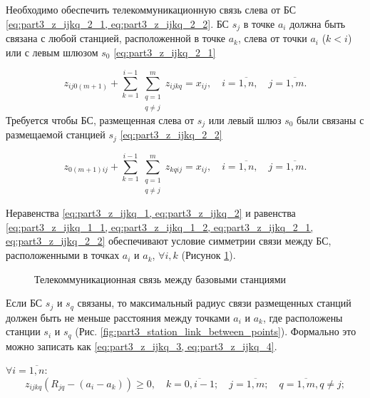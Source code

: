 Необходимо обеспечить телекоммуникационную связь слева от БС \cref{eq:part3_z_ijkq_2_1, eq:part3_z_ijkq_2_2}. БС $ s_j $ в точке $ a_i $ должна быть связана с  любой станцией, расположенной в точке $ a_k $, слева от точки $ a_i $ ($ k <i $) или с левым шлюзом $ s_{0}$ \cref{eq:part3_z_ijkq_2_1} 

\begin{equation}
  \label{eq:part3_z_ijkq_2_1}
  z_{ij0(m+1)} + \sum\limits_{k=1}^{i-1} \sum\limits_{\substack{q = 1\\ q \neq j}}^m z_{ijkq}= x_{ij}, \quad i = \overline{1, n}, \quad j = \overline{1, m}.
\end{equation}
Требуется чтобы БС, размещенная слева от $s_j$ или левый шлюз $ s_{0} $  были связаны с размещаемой станцией $ s_j $ \cref{eq:part3_z_ijkq_2_2}

\begin{equation}
  \label{eq:part3_z_ijkq_2_2}
    z_{0(m+1)ij} +  \sum\limits_{k=1}^{i-1} \sum\limits_{\substack{q = 1 \\ q \neq j}}^m z_{kqij}= x_{ij},  \quad i = \overline{1, n}, \quad j = \overline{1, m}.
\end{equation}


Неравенства \cref{eq:part3_z_ijkq_1, eq:part3_z_ijkq_2} и равенства \cref{eq:part3_z_ijkq_1_1, eq:part3_z_ijkq_1_2, eq:part3_z_ijkq_2_1, eq:part3_z_ijkq_2_2} обеспечивают условие симметрии связи между БС, расположенными в точках $ a_i $ и $ a_k $, $\forall i, k $ (Рисунок \cref{fig:part3_station_link}).

\begin{figure}[ht]
  \caption{Телекоммуникационная связь между базовыми станциями}\label{fig:part3_station_link}
\end{figure}

Если БС $ s_j $ и $ s_q $ связаны, то максимальный радиус связи размещенных станций должен быть не меньше расстояния между точками $ a_i $ и $ a_k $, где расположены станции $ s_i $ и $ s_q $ (Рис. \cref{fig:part3_station_link_between_points}). Формально это можно записать как \cref{eq:part3_z_ijkq_3, eq:part3_z_ijkq_4}.

 $\forall i= \overline{1,n}$:
\begin{equation}
  \label{eq:part3_z_ijkq_3}
  z_{ijkq}(R_{jq}-(a_i-a_k ))\geq 0, \quad k=\overline{0,i-1}; \quad j=\overline{1,m}; \quad q= \overline{1,m}, q \neq j; 
\end{equation}

